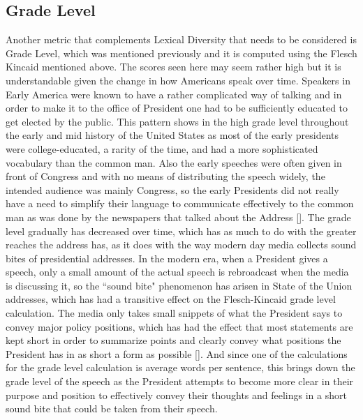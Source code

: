 \subsection{Grade Level}
Another metric that complements Lexical Diversity that needs to be considered is Grade Level, which was mentioned previously and it is computed using the Flesch Kincaid mentioned above.
The scores seen here may seem rather high but it is understandable given the change in how Americans speak over time.
Speakers in Early America were known to have a rather complicated way of talking and in order to make it to the office of President one had to be sufficiently educated to get elected by the public.
This pattern shows in the high grade level throughout the early and mid history of the United States as most of the early presidents were college-educated, a rarity of the time, and had a more sophisticated vocabulary than the common man.
Also the early speeches were often given in front of Congress and with no means of distributing the speech widely, the intended audience was mainly Congress, so the early Presidents did not really have a need to simplify their language to communicate effectively to the common man as was done by the newspapers that talked about the Address [\cite{ziff1991writing}].
The grade level gradually has decreased over time, which has as much to do with the greater reaches the address has, as it does with the way modern day media collects sound bites of presidential addresses.
In the modern era, when a President gives a speech, only a small amount of the actual speech is rebroadcast when the media is discussing it, so the ``sound bite" phenomenon has arisen in State of the Union addresses, which has had a transitive effect on the Flesch-Kincaid grade level calculation.
The media only takes small snippets of what the President says to convey major policy positions, which has had the effect that most statements are kept short in order to summarize points and clearly convey what positions the President has in as short a form as possible [\cite{paletz1977presidents}].
And since one of the calculations for the grade level calculation is average words per sentence, this brings down the grade level of the speech as the President attempts to become more clear in their purpose and position to effectively convey their thoughts and feelings in a short sound bite that could be taken from their speech.